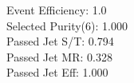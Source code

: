 Event Efficiency:   1.0\\ 
Selected Purity(6): 1.000\\ 
Passed Jet S/T:     0.794\\ 
Passed Jet MR:      0.328\\ 
Passed Jet Eff:     1.000